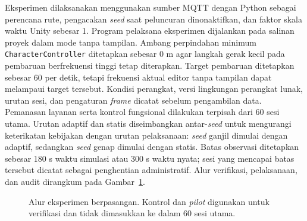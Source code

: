 \documentclass[10pt,a4paper]{article}
\begin{document}
Eksperimen dilaksanakan menggunakan sumber MQTT dengan Python sebagai perencana rute, pengacakan \emph{seed} saat peluncuran dinonaktifkan, dan faktor skala waktu Unity sebesar 1. Program pelaksana eksperimen dijalankan pada salinan proyek dalam mode tanpa tampilan. Ambang perpindahan minimum \texttt{CharacterController} ditetapkan sebesar 0 m agar langkah gerak kecil pada pembaruan berfrekuensi tinggi tetap diterapkan. Target pembaruan ditetapkan sebesar 60 per detik, tetapi frekuensi aktual editor tanpa tampilan dapat melampaui target tersebut. Kondisi perangkat, versi lingkungan perangkat lunak, urutan sesi, dan pengaturan \emph{frame} dicatat sebelum pengambilan data. Pemanasan layanan serta kontrol fungsional dilakukan terpisah dari 60 sesi utama. Urutan adaptif dan statis diseimbangkan antar-\emph{seed} untuk mengurangi keterikatan kebijakan dengan urutan pelaksanaan: \emph{seed} ganjil dimulai dengan adaptif, sedangkan \emph{seed} genap dimulai dengan statis. Batas observasi ditetapkan sebesar 180 s waktu simulasi atau 300 s waktu nyata; sesi yang mencapai batas tersebut dicatat sebagai penghentian administratif. Alur verifikasi, pelaksanaan, dan audit dirangkum pada Gambar~\ref{fig:experiment}.

\begin{figure}[!htbp]
\centering
{}
\caption{Alur eksperimen berpasangan. Kontrol dan \emph{pilot} digunakan untuk verifikasi dan tidak dimasukkan ke dalam 60 sesi utama.}
\label{fig:experiment}
\end{figure}
\end{document}
